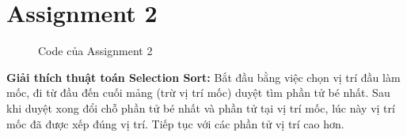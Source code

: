 \documentclass[a4paper,12pt]{article}
\begin{document}
\section{Assignment 2}
\begin{figure}[!h]
	\centering
	\caption{Code của Assignment 2} 
\end{figure}
\noindent
\textbf{Giải thích thuật toán Selection Sort: }Bắt đầu bằng việc chọn vị trí đầu làm mốc, đi từ đầu đến cuối mảng (trừ vị trí mốc) duyệt tìm phần tử bé nhất. Sau khi duyệt xong đổi chỗ phần tử bé nhất và phần tử tại vị trí mốc, lúc này vị trí mốc đã được xếp đúng vị trí. Tiếp tục với các phần tử vị trí cao hơn.
\clearpage
\end{document}
